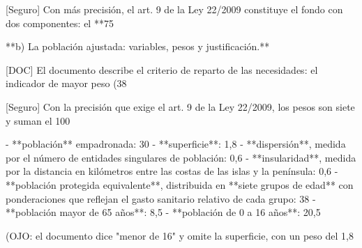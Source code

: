\documentclass[10pt,a4paper]{article}
\begin{document}
[Seguro] Con más precisión, el art. 9 de la Ley 22/2009 constituye el fondo con dos componentes: el **75%

**b) La población ajustada: variables, pesos y justificación.**

[DOC] El documento describe el criterio de reparto de las necesidades: el indicador de mayor peso (38%

[Seguro] Con la precisión que exige el art. 9 de la Ley 22/2009, los pesos son siete y suman el 100%

- **población** empadronada: 30%
- **superficie**: 1,8%
- **dispersión**, medida por el número de entidades singulares de población: 0,6%
- **insularidad**, medida por la distancia en kilómetros entre las costas de las islas y la península: 0,6%
- **población protegida equivalente**, distribuida en **siete grupos de edad** con ponderaciones que reflejan el gasto sanitario relativo de cada grupo: 38%
- **población mayor de 65 años**: 8,5%
- **población de 0 a 16 años**: 20,5%

(OJO: el documento dice "menor de 16" y omite la superficie, con un peso del 1,8%
\end{document}

